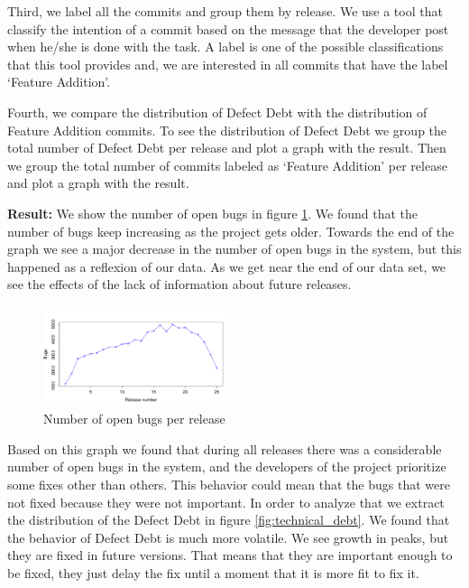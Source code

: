 Third, we label all the commits and group them by release. We use a tool that classify the intention of a commit based on the message that the developer post when he/she is done with the task. A label is one of the possible classifications that this tool provides and, we are interested in all commits that have the label `Feature Addition'.   

Fourth, we compare the distribution of Defect Debt with the distribution of Feature Addition commits. To see the distribution of Defect Debt we group the total number of Defect Debt per release and plot a graph with the result. Then we group the total number of commits labeled as `Feature Addition' per release and plot a graph with the result.

\vspace{1mm}
\noindent\textbf{Result:} We show the number of open bugs in figure \ref{fig:number_of_bugs_releases}. We found that the number of bugs keep increasing as the project gets older. Towards the end of the graph we see a major decrease in the number of open bugs in the system, but this happened as a reflexion of our data. As we get near the end of our data set, we see the effects of the lack of information about future releases. 

\begin{figure}[thb!]
	\caption{Number of open bugs per release}
	\label{fig:number_of_bugs_releases}
	\includegraphics[width=0.49\textwidth]{figures/number_of_bugs_releases}
\end{figure}
  
Based on this graph we found that during all releases there was a considerable number of open bugs in the system, and the developers of the project prioritize some fixes other than others. This behavior could mean that the bugs that were not fixed because they were not important. In order to analyze that we extract the distribution of the Defect Debt in figure \ref{fig:technical_debt}. We found that the behavior of Defect Debt is much more volatile. We see growth in peaks, but they are fixed in future versions. That means that they are important enough to be fixed, they just delay the fix until a moment that it is more fit to fix it. 

